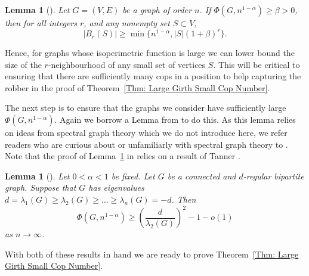 \documentclass{amsart}
\newtheorem{lemma}[theorem]{Lemma}
\theoremstyle{definition}
\begin{document}
\begin{lemma}[\cite{bradshaw2023cop}]\label{Lemma: Neighbourhood Size given Normalized Isoperimetric Function}
Let $G = (V,E)$ be a graph of order $n$. If $\Phi (G,n^{1-\alpha}) \geq \beta > 0$, then for all integers $r$, and any nonempty set $S \subset V$, 
\[
|B_r(S)| \geq \min\{ n^{1-\alpha}, |S|(1+\beta)^r\}.
\]
\end{lemma}

Hence, for graphs whose isoperimetric function is large we can lower bound the size of the $r$-neighbourhood of any small set of vertices $S$. This will be critical to ensuring that there are sufficiently many cops in a position to help capturing the robber in the proof of Theorem~\ref{Thm: Large Girth Small Cop Number}.


The next step is to ensure that the graphs we consider have sufficiently large $\Phi (G,n^{1-\alpha})$. Again we borrow a Lemma from \cite{bradshaw2023cop} to do this. As this lemma relies on ideas from spectral graph theory which we do not introduce here, we refer readers who are curious about or unfamiliarly with spectral graph theory to  \cite{chung1997spectral}. Note that the proof of Lemma~\ref{Lemma: Isomtermteric Lower Bound for X^{p,q}} in \cite{bradshaw2023cop} relies on a result of Tanner \cite{tanner1984explicit}. 

\begin{lemma}[\cite{bradshaw2023cop}]\label{Lemma: Isomtermteric Lower Bound for X^{p,q}}
Let $0 < \alpha < 1$ be fixed. Let $G$ be a connected and $d$-regular bipartite graph. Suppose that $G$ has eigenvalues $d = \lambda_1(G) \geq \lambda_2(G) \geq \dots \geq \lambda_n(G) = -d$. Then 
\[
\Phi (G,n^{1-\alpha}) \geq (\frac{d}{\lambda_2(G)})^2 - 1 - o(1)
\]
as $n \rightarrow \infty$.
\end{lemma}

With both of these results in hand we are ready to prove Theorem~\ref{Thm: Large Girth Small Cop Number}.
\end{document}
